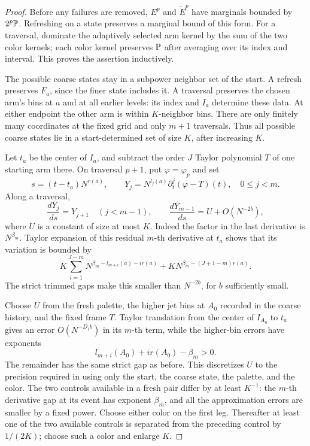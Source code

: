 \begin{proof}
Before any failures are removed, \(E^p\) and \(\widetilde E^p\)
have marginals bounded by \(2^p\mathbb P\).  Refreshing on a state preserves
a marginal bound of this form.  For a traversal, dominate the
adaptively selected arm kernel by the sum of the two color kernels;
each color kernel preserves \(\mathbb P\) after averaging over its
index and interval.  This proves the assertion inductively.

The possible coarse states stay in a subpower neighbor set of the
start.  A refresh preserves \(F_a\), since the finer state includes
it.  A traversal preserves the chosen arm's bins at \(a\) and at
all earlier levels: its index and \(I_a\) determine these data.
At either endpoint the other arm is within \(K\)-neighbor bins.
There are only finitely many coordinates at the fixed grid and
only \(m+1\) traversals.  Thus all possible coarse states lie in a
start-determined set of size \(K\), after increasing \(K\).

Let \(t_a\) be the center of \(I_a\), and subtract the order \(J\)
Taylor polynomial \(T\) of one starting arm there.  On traversal
\(p+1\), put \(\varphi=\varphi_p\) and set
\[
 s=(t-t_a)N^{r(a)},\qquad
 Y_j=N^{l_j(a)}\partial_t^j(\varphi-T)(t),
 \quad 0\le j<m.
\]
Along a traversal,
\begin{equation}
 \frac{dY_j}{ds}=Y_{j+1}\quad(j<m-1),\qquad
 \frac{dY_{m-1}}{ds}=U+O(N^{-2b}),
 \label{a02:controlled-jets}
\end{equation}
where \(U\) is a constant of size at most \(K\).
Indeed the factor in the last derivative is \(N^{\beta_m}\).
Taylor expansion of this residual \(m\)-th derivative at \(t_a\)
shows that its variation is bounded by
\[
 K\sum_{i=1}^{J-m}
 N^{\beta_m-l_{m+i}(a)-ir(a)}
 +K N^{\beta_m-(J+1-m)r(a)}.
\]
The strict trimmed gaps make this smaller than \(N^{-2b}\), for
\(b\) sufficiently small.

Choose \(U\) from the fresh palette, the higher jet bins at \(A_0\)
recorded in the coarse history, and the fixed frame \(T\).  Taylor
translation from the center of \(I_{A_0}\) to \(t_a\) gives an error
\(O(N^{-D_1b})\) in its \(m\)-th term, while the higher-bin errors
have exponents
\[
 l_{m+i}(A_0)+ir(A_0)-\beta_m>0.
\]
The remainder has the same strict gap as before.  This discretizes
\(U\) to the precision required in  using
only the start, the coarse state, the palette, and the color.
The two controls available in a fresh pair differ by at least
\(K^{-1}\): the \(m\)-th derivative gap at its event has exponent
\(\beta_m\), and all the approximation errors are smaller by a
fixed power.  Choose either color on the first leg.  Thereafter
at least one of the two available controls is separated from the
preceding control by \(1/(2K)\); choose such a color and enlarge \(K\).


\end{proof}
